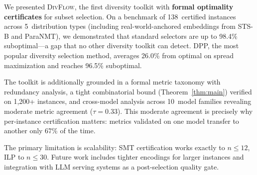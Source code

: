 \documentclass[11pt,a4paper]{article}
\newcommand{\divflow}{\textsc{DivFlow}}
\begin{document}
We presented \divflow{}, the first diversity toolkit with
\textbf{formal optimality certificates} for subset selection.
On a benchmark of 138~certified instances across 5~distribution
types (including real-world-anchored embeddings from STS-B and
ParaNMT), we demonstrated that standard selectors are up to
98.4\% suboptimal---a gap that no other diversity toolkit
can detect.  DPP, the most popular diversity selection method,
averages 26.0\% from optimal on spread maximization and reaches
96.5\% suboptimal.

The toolkit is additionally grounded in a formal metric taxonomy
with redundancy analysis, a tight combinatorial bound
(Theorem~\ref{thm:main}) verified on 1{,}200+ instances, and
cross-model analysis across 10~model families revealing
moderate metric agreement ($\tau = 0.33$).  This moderate
agreement is precisely why per-instance certification matters:
metrics validated on one model transfer to another only 67\%
of the time.

The primary limitation is scalability: SMT certification works
exactly to $n \leq 12$, ILP to $n \leq 30$.  Future work
includes tighter encodings for larger instances and integration
with LLM serving systems as a post-selection quality gate.
\end{document}
